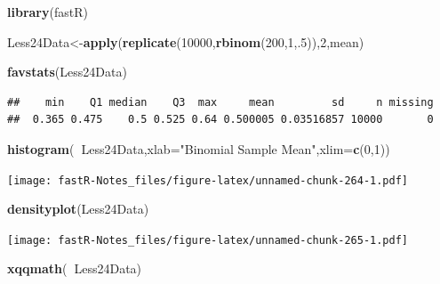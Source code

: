 \documentclass[]{book}
\newenvironment{Shaded}{\begin{snugshade}}{\end{snugshade}}
\newcommand{\KeywordTok}[1]{\textcolor[rgb]{0.13,0.29,0.53}{\textbf{#1}}}
\newcommand{\DataTypeTok}[1]{\textcolor[rgb]{0.13,0.29,0.53}{#1}}
\newcommand{\DecValTok}[1]{\textcolor[rgb]{0.00,0.00,0.81}{#1}}
\newcommand{\StringTok}[1]{\textcolor[rgb]{0.31,0.60,0.02}{#1}}
\newcommand{\OperatorTok}[1]{\textcolor[rgb]{0.81,0.36,0.00}{\textbf{#1}}}
\newcommand{\NormalTok}[1]{#1}
\theoremstyle{definition}
\theoremstyle{definition}
\theoremstyle{definition}
\theoremstyle{remark}
\begin{document}
\begin{Shaded}
\begin{Highlighting}[]
\KeywordTok{library}\NormalTok{(fastR)}
\end{Highlighting}
\end{Shaded}

\begin{Shaded}
\begin{Highlighting}[]
\NormalTok{Less24Data<-}\KeywordTok{apply}\NormalTok{(}\KeywordTok{replicate}\NormalTok{(}\DecValTok{10000}\NormalTok{,}\KeywordTok{rbinom}\NormalTok{(}\DecValTok{200}\NormalTok{,}\DecValTok{1}\NormalTok{,.}\DecValTok{5}\NormalTok{)),}\DecValTok{2}\NormalTok{,mean)}
\end{Highlighting}
\end{Shaded}

\begin{Shaded}
\begin{Highlighting}[]
\KeywordTok{favstats}\NormalTok{(Less24Data)}
\end{Highlighting}
\end{Shaded}

\begin{verbatim}
##    min    Q1 median    Q3  max     mean         sd     n missing
##  0.365 0.475    0.5 0.525 0.64 0.500005 0.03516857 10000       0
\end{verbatim}

\begin{Shaded}
\begin{Highlighting}[]
\KeywordTok{histogram}\NormalTok{(}\OperatorTok{~}\NormalTok{Less24Data,}\DataTypeTok{xlab=}\StringTok{"Binomial Sample Mean"}\NormalTok{,}\DataTypeTok{xlim=}\KeywordTok{c}\NormalTok{(}\DecValTok{0}\NormalTok{,}\DecValTok{1}\NormalTok{))}
\end{Highlighting}
\end{Shaded}

\texttt{[image: fastR-Notes\_files/figure-latex/unnamed-chunk-264-1.pdf]}

\begin{Shaded}
\begin{Highlighting}[]
\KeywordTok{densityplot}\NormalTok{(Less24Data)}
\end{Highlighting}
\end{Shaded}

\texttt{[image: fastR-Notes\_files/figure-latex/unnamed-chunk-265-1.pdf]}

\begin{Shaded}
\begin{Highlighting}[]
\KeywordTok{xqqmath}\NormalTok{(}\OperatorTok{~}\NormalTok{Less24Data)}
\end{Highlighting}
\end{Shaded}
\end{document}

